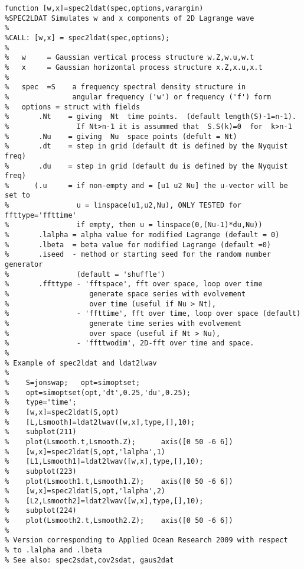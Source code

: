 {\begin{verbatim}
function [w,x]=spec2ldat(spec,options,varargin)
%SPEC2LDAT Simulates w and x components of 2D Lagrange wave
%           
%CALL: [w,x] = spec2ldat(spec,options);
% 
%   w     = Gaussian vertical process structure w.Z,w.u,w.t
%   x     = Gaussian horizontal process structure x.Z,x.u,x.t
%
%   spec  =S    a frequency spectral density structure in 
%               angular frequency ('w') or frequency ('f') form 
%   options = struct with fields 
%       .Nt    = giving  Nt  time points.  (default length(S)-1=n-1).
%                If Nt>n-1 it is assummed that  S.S(k)=0  for  k>n-1
%       .Nu    = giving  Nu  space points (defult = Nt)
%       .dt    = step in grid (default dt is defined by the Nyquist freq) 
%       .du    = step in grid (default du is defined by the Nyquist freq)
%      (.u     = if non-empty and = [u1 u2 Nu] the u-vector will be set to 
%                u = linspace(u1,u2,Nu), ONLY TESTED for ffttype='ffttime'
%                if empty, then u = linspace(0,(Nu-1)*du,Nu))
%       .lalpha = alpha value for modified Lagrange (default = 0)
%       .lbeta  = beta value for modified Lagrange (default =0)
%       .iseed  - method or starting seed for the random number generator 
%                (default = 'shuffle')
%       .ffttype - 'fftspace', fft over space, loop over time
%                   generate space series with evolvement 
%                   over time (useful if Nu > Nt),  
%                - 'ffttime', fft over time, loop over space (default) 
%                   generate time series with evolvement 
%                   over space (useful if Nt > Nu),  
%                - 'ffttwodim', 2D-fft over time and space.  
%
% Example of spec2ldat and ldat2lwav
%
%    S=jonswap;   opt=simoptset; 
%    opt=simoptset(opt,'dt',0.25,'du',0.25);
%    type='time';
%    [w,x]=spec2ldat(S,opt)
%    [L,Lsmooth]=ldat2lwav([w,x],type,[],10);
%    subplot(211)
%    plot(Lsmooth.t,Lsmooth.Z);      axis([0 50 -6 6])
%    [w,x]=spec2ldat(S,opt,'lalpha',1)
%    [L1,Lsmooth1]=ldat2lwav([w,x],type,[],10);
%    subplot(223)
%    plot(Lsmooth1.t,Lsmooth1.Z);    axis([0 50 -6 6])
%    [w,x]=spec2ldat(S,opt,'lalpha',2)
%    [L2,Lsmooth2]=ldat2lwav([w,x],type,[],10);
%    subplot(224)
%    plot(Lsmooth2.t,Lsmooth2.Z);    axis([0 50 -6 6])
%
% Version corresponding to Applied Ocean Research 2009 with respect 
% to .lalpha and .lbeta 
% See also: spec2sdat,cov2sdat, gaus2dat
\end{verbatim}
\clearpage

}
